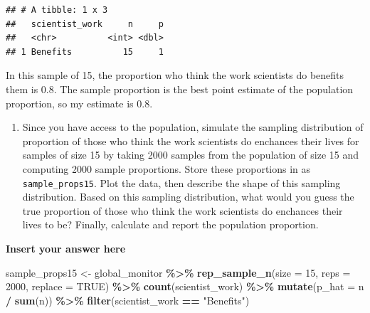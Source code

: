 \documentclass[
]{article}
\newenvironment{Shaded}{\begin{snugshade}}{\end{snugshade}}
\newcommand{\AttributeTok}[1]{\textcolor[rgb]{0.13,0.29,0.53}{#1}}
\newcommand{\ConstantTok}[1]{\textcolor[rgb]{0.56,0.35,0.01}{#1}}
\newcommand{\DecValTok}[1]{\textcolor[rgb]{0.00,0.00,0.81}{#1}}
\newcommand{\FunctionTok}[1]{\textcolor[rgb]{0.13,0.29,0.53}{\textbf{#1}}}
\newcommand{\NormalTok}[1]{#1}
\newcommand{\OtherTok}[1]{\textcolor[rgb]{0.56,0.35,0.01}{#1}}
\newcommand{\SpecialCharTok}[1]{\textcolor[rgb]{0.81,0.36,0.00}{\textbf{#1}}}
\newcommand{\StringTok}[1]{\textcolor[rgb]{0.31,0.60,0.02}{#1}}
\providecommand{\tightlist}{%
  \setlength{\itemsep}{0pt}\setlength{\parskip}{0pt}}
\begin{document}
\begin{verbatim}
## # A tibble: 1 x 3
##   scientist_work     n     p
##   <chr>          <int> <dbl>
## 1 Benefits          15     1
\end{verbatim}

\begin{Shaded}
\end{Shaded}

In this sample of 15, the proportion who think the work scientists do
benefits them is 0.8. The sample proportion is the best point estimate
of the population proportion, so my estimate is 0.8.

\begin{enumerate}
\def\labelenumi{\arabic{enumi}.}
\setcounter{enumi}{7}
\tightlist
\item
  Since you have access to the population, simulate the sampling
  distribution of proportion of those who think the work scientists do
  enchances their lives for samples of size 15 by taking 2000 samples
  from the population of size 15 and computing 2000 sample proportions.
  Store these proportions in as \texttt{sample\_props15}. Plot the data,
  then describe the shape of this sampling distribution. Based on this
  sampling distribution, what would you guess the true proportion of
  those who think the work scientists do enchances their lives to be?
  Finally, calculate and report the population proportion.
\end{enumerate}

\textbf{Insert your answer here}

\begin{Shaded}
\begin{Highlighting}[]
\NormalTok{sample\_props15 }\OtherTok{\textless{}{-}}\NormalTok{ global\_monitor }\SpecialCharTok{\%\textgreater{}\%}
  \FunctionTok{rep\_sample\_n}\NormalTok{(}\AttributeTok{size =} \DecValTok{15}\NormalTok{, }\AttributeTok{reps =} \DecValTok{2000}\NormalTok{, }\AttributeTok{replace =} \ConstantTok{TRUE}\NormalTok{) }\SpecialCharTok{\%\textgreater{}\%}
  \FunctionTok{count}\NormalTok{(scientist\_work) }\SpecialCharTok{\%\textgreater{}\%}
  \FunctionTok{mutate}\NormalTok{(}\AttributeTok{p\_hat =}\NormalTok{ n }\SpecialCharTok{/} \FunctionTok{sum}\NormalTok{(n)) }\SpecialCharTok{\%\textgreater{}\%}
  \FunctionTok{filter}\NormalTok{(scientist\_work }\SpecialCharTok{==} \StringTok{"Benefits"}\NormalTok{)}
\end{Highlighting}
\end{Shaded}
\end{document}
